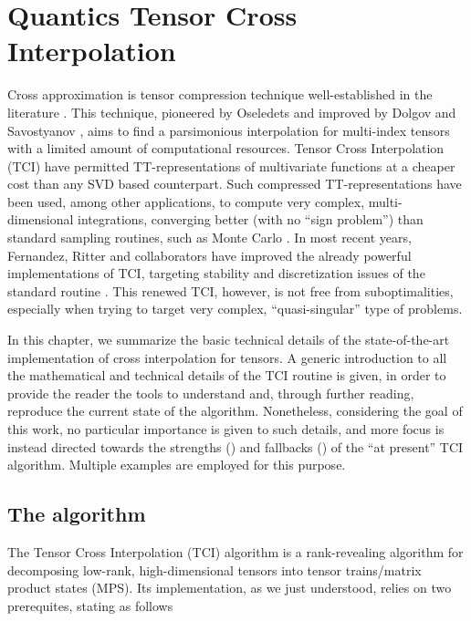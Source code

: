 \chapter{Quantics Tensor Cross Interpolation}
\label{chap:QTCI}

Cross approximation is tensor compression technique well-established in the literature \cite{Oseledets2010, Dolgov2020, Savostyanov2011, Savostyanov2014, Fernandez2022, Fernandez2024}. This technique, pioneered by Oseledets \cite{Oseledets2010} and improved by Dolgov and Savostyanov \cite{Dolgov2020}, aims to find a parsimonious interpolation for multi-index tensors with a limited amount of computational resources. Tensor Cross Interpolation (TCI) have permitted TT-representations of multivariate functions at a cheaper cost than any SVD based counterpart. Such compressed TT-representations have been used, among other applications, to compute very complex, multi-dimensional integrations, converging better (with no ``sign problem'') than standard sampling routines, such as Monte Carlo \cite{Fernandez2022, Dolgov2020}. In most recent years, Fernandez, Ritter and collaborators have improved the already powerful implementations of TCI, targeting stability and discretization issues of the standard routine \cite{Fernandez2024}. This renewed TCI, however, is not free from suboptimalities, especially when trying to target very complex, ``quasi-singular'' type of problems. 

In this chapter, we summarize the basic technical details of the state-of-the-art implementation of cross interpolation for tensors. A generic introduction to all the mathematical and technical details of the TCI routine is given, in order to provide the reader the tools to understand and, through further reading, reproduce the current state of the algorithm. Nonetheless, considering the goal of this work, no particular importance is given to such details, and more focus is instead directed towards the strengths () and fallbacks () of the ``at present'' TCI algorithm. Multiple examples are employed for this purpose.

\section{The algorithm}
\label{sec:TCIalgorithm}

The Tensor Cross Interpolation (TCI) algorithm is a rank-revealing algorithm for decomposing low-rank, high-dimensional tensors into tensor trains/matrix product states (MPS). Its implementation, as we just understood, relies on two prerequites, stating as follows

